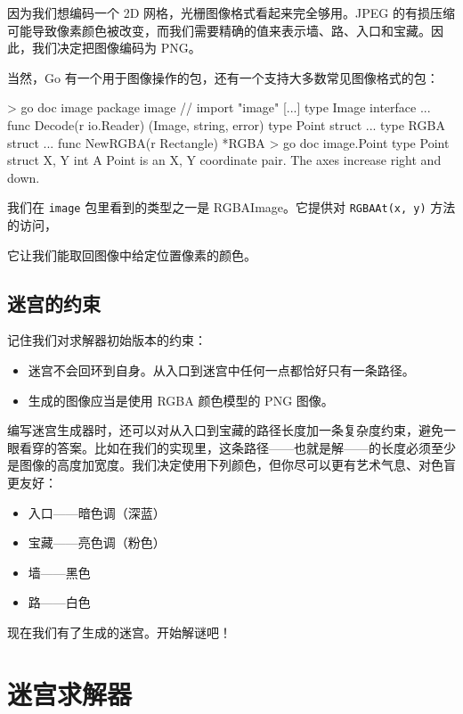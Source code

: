 因为我们想编码一个 2D 网格，光栅图像格式看起来完全够用。JPEG 的有损压缩可能导致像素颜色被改变，而我们需要精确的值来表示墙、路、入口和宝藏。因此，我们决定把图像编码为 PNG。

当然，Go 有一个用于图像操作的包，还有一个支持大多数常见图像格式的包：

\begin{shellcode}[]
> go doc image
package image // import "image"
[...]
type Image interface{ ... }
    func Decode(r io.Reader) (Image, string, error)
type Point struct{ ... }
type RGBA struct{ ... }
    func NewRGBA(r Rectangle) *RGBA
> go doc image.Point
type Point struct {
    X, Y int
}
    A Point is an X, Y coordinate pair. The axes increase right and down.
\end{shellcode}

我们在 \texttt{image} 包里看到的类型之一是 RGBAImage。它提供对 \texttt{RGBAAt(x, y)} 方法的访问，

它让我们能取回图像中给定位置像素的颜色。

\subsection{迷宫的约束}

记住我们对求解器初始版本的约束：

\begin{itemize}
  \item 迷宫不会回环到自身。从入口到迷宫中任何一点都恰好只有一条路径。
  \item 生成的图像应当是使用 RGBA 颜色模型的 PNG 图像。
\end{itemize}

编写迷宫生成器时，还可以对从入口到宝藏的路径长度加一条复杂度约束，避免一眼看穿的答案。比如在我们的实现里，这条路径——也就是解——的长度必须至少是图像的高度加宽度。我们决定使用下列颜色，但你尽可以更有艺术气息、对色盲更友好：

\begin{itemize}
  \item 入口——暗色调（深蓝）
  \item 宝藏——亮色调（粉色）
  \item 墙——黑色
  \item 路——白色
\end{itemize}

现在我们有了生成的迷宫。开始解谜吧！

\section{迷宫求解器}

